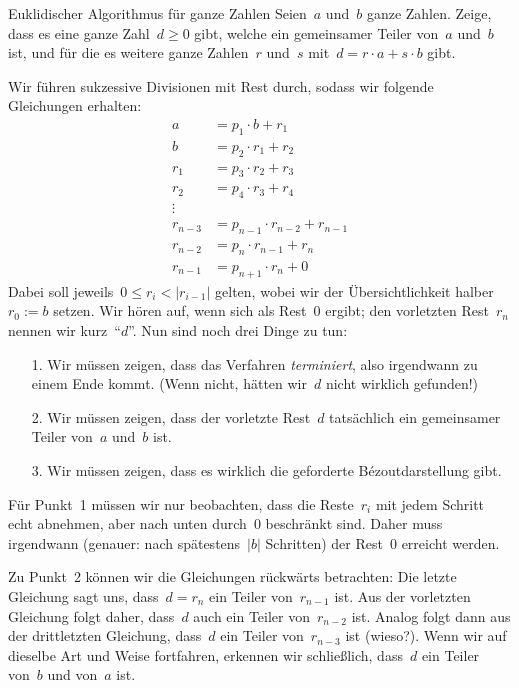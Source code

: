 \documentclass{algblatt}
\begin{document}
\ifloesungen\newpage\fi
\begin{aufgabe}{Euklidischer Algorithmus für ganze Zahlen}
Seien~$a$ und~$b$ ganze Zahlen. Zeige, dass es eine ganze Zahl~$d
\geq 0$ gibt, welche ein gemeinsamer Teiler von~$a$ und~$b$ ist, und für die es
weitere ganze Zahlen~$r$ und~$s$ mit~$d = r \cdot a + s \cdot b$ gibt.

\begin{loesung}
Wir führen sukzessive Divisionen mit Rest durch, sodass wir folgende
Gleichungen erhalten:
\begin{align*}
  a &= p_1 \cdot b + r_1 \\
  b &= p_2 \cdot r_1 + r_2 \\
  r_1 &= p_3 \cdot r_2 + r_3 \\
  r_2 &= p_4 \cdot r_3 + r_4 \\
  \vdots \\
  r_{n-3} &= p_{n-1} \cdot r_{n-2} + r_{n-1} \\
  r_{n-2} &= p_{n} \cdot r_{n-1} + r_{n} \\
  r_{n-1} &= p_{n+1} \cdot r_{n} + 0
\end{align*}
Dabei soll jeweils~$0 \leq r_i < |r_{i-1}|$ gelten, wobei wir der
Übersichtlichkeit halber~$r_0 := b$ setzen. Wir hören auf, wenn sich als
Rest~$0$ ergibt; den vorletzten Rest~$r_n$ nennen wir kurz~"`$d$"'. Nun sind
noch drei Dinge zu tun:
\begin{enumerate}
\item[1.] Wir müssen zeigen, dass das Verfahren \emph{terminiert}, also
irgendwann zu einem Ende kommt. (Wenn nicht, hätten wir~$d$ nicht wirklich
gefunden!)
\item[2.] Wir müssen zeigen, dass der vorletzte Rest~$d$ tatsächlich ein
gemeinsamer Teiler von~$a$ und~$b$ ist.
\item[3.] Wir müssen zeigen, dass es wirklich die geforderte Bézoutdarstellung
gibt.
\end{enumerate}
Für Punkt~1 müssen wir nur beobachten, dass die Reste~$r_i$ mit jedem Schritt
echt abnehmen, aber nach unten durch~$0$ beschränkt sind. Daher muss
irgendwann (genauer: nach spätestens~$|b|$ Schritten) der Rest~$0$
erreicht werden.

Zu Punkt~2 können wir die Gleichungen rückwärts betrachten: Die letzte
Gleichung sagt uns, dass~$d = r_n$ ein Teiler von~$r_{n-1}$ ist. Aus der
vorletzten Gleichung folgt daher, dass~$d$ auch ein Teiler von~$r_{n-2}$ ist.
Analog folgt dann aus der drittletzten Gleichung, dass~$d$ ein Teiler
von~$r_{n-3}$ ist (wieso?). Wenn wir auf dieselbe Art und Weise fortfahren,
erkennen wir schließlich, dass~$d$ ein Teiler von~$b$ und von~$a$ ist.


\end{loesung}
\end{aufgabe}
\end{document}
